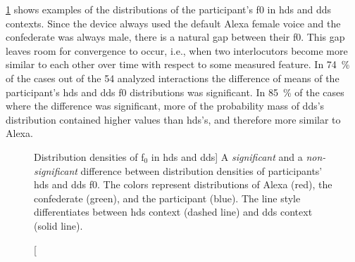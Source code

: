 \cref{fig:hds_dds_dist_pitch_comparison} shows examples of the distributions of the participant's \ac{f0} in \ac{hds} and \ac{dds} contexts.
Since the device always used the default Alexa female voice and the confederate was always male, there is a natural gap between their \ac{f0}.
This gap leaves room for convergence to occur, i.e., when two interlocutors become more similar to each other over time with respect to some measured feature.
In \SI{74}{\percent} of the cases out of the 54 analyzed interactions the difference of means of the participant's \ac{hds} and \ac{dds} \ac{f0} distributions was significant.
In \SI{85}{\percent} of the cases where the difference was significant, more of the probability mass of \ac{dds}'s distribution contained higher values than \ac{hds}'s, and therefore more similar to Alexa.

\begin{figure}[t]
	\centering
	\hfill %
	\caption
	[Distribution densities of f$_0$ in \ac{hds} and \ac{dds}]
	{A \emph{significant}  and a \emph{non-significant}  difference between distribution densities of participants' \ac{hds} and \ac{dds} \ac{f0}.
		The colors represent distributions of Alexa (red), the confederate (green), and the participant (blue).
		The line style differentiates between \ac{hds} context (dashed line) and \ac{dds} context (solid line).}
	\label{fig:hds_dds_dist_pitch_comparison}
\end{figure}

